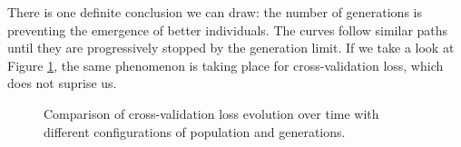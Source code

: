	There is one definite conclusion we can draw: the number of generations is preventing the emergence of better individuals. The curves follow similar paths until they are progressively stopped by the generation limit. If we take a look at Figure \ref{gfx:fs_popgen_cv}, the same phenomenon is taking place for cross-validation loss, which does not suprise us.

\newpage

	\begin{figure}[bth]

        \begin{center}

        	\setlength{\fboxrule}{0pt}

		\end{center}
		\caption[Cross-validation loss comparison for different populations and generations]{Comparison of cross-validation loss evolution over time with different configurations of population and generations.}\label{gfx:fs_popgen_cv}

	\end{figure}


